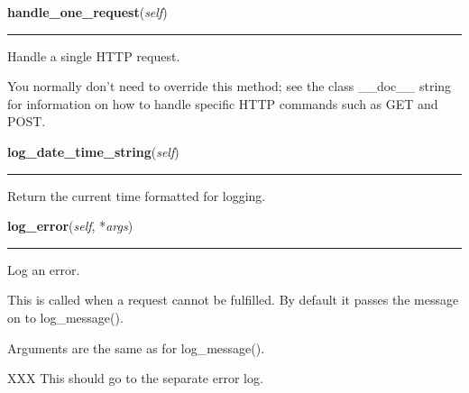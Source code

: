     \label{BaseHTTPServer:BaseHTTPRequestHandler:handle_one_request}

    \vspace{0.5ex}

    \begin{boxedminipage}{\textwidth}

    \raggedright \textbf{handle\_one\_request}(\textit{self})

    \vspace{-1.5ex}

    \rule{\textwidth}{0.5\fboxrule}
    Handle a single HTTP request.

    You normally don't need to override this method; see the class 
    \_\_doc\_\_ string for information on how to handle specific HTTP 
    commands such as GET and POST.

    \vspace{1ex}

    \end{boxedminipage}

    \label{BaseHTTPServer:BaseHTTPRequestHandler:log_date_time_string}

    \vspace{0.5ex}

    \begin{boxedminipage}{\textwidth}

    \raggedright \textbf{log\_date\_time\_string}(\textit{self})

    \vspace{-1.5ex}

    \rule{\textwidth}{0.5\fboxrule}
    Return the current time formatted for logging.

    \vspace{1ex}

    \end{boxedminipage}

    \label{BaseHTTPServer:BaseHTTPRequestHandler:log_error}

    \vspace{0.5ex}

    \begin{boxedminipage}{\textwidth}

    \raggedright \textbf{log\_error}(\textit{self}, *\textit{args})

    \vspace{-1.5ex}

    \rule{\textwidth}{0.5\fboxrule}
    Log an error.

    This is called when a request cannot be fulfilled.  By default it 
    passes the message on to log\_message().

    Arguments are the same as for log\_message().

    XXX This should go to the separate error log.

    \vspace{1ex}

    \end{boxedminipage}


